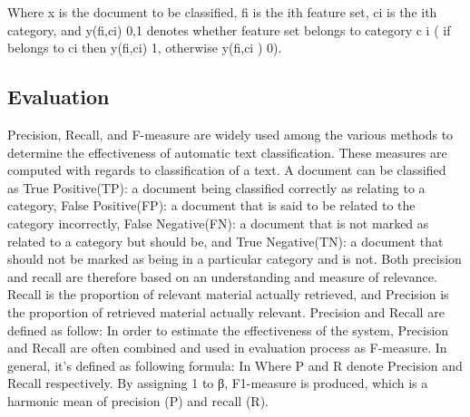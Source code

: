 \documentclass{sigchi}
\begin{document}
Where x is the document to be classified, fi is the ith feature set, ci is the ith category, and y(fi,ci) {0,1} denotes whether feature set belongs to category c i ( if belongs to ci then y(fi,ci) 1, otherwise y(fi,ci ) 0).

\subsection{Evaluation}
Precision, Recall, and F-measure are widely used among the various methods to determine the effectiveness of automatic text classification. 
These measures are computed with regards to classification of a text. 
A document can be classified~\cite{ikonomakis2005text} as True Positive(TP): a document being classified correctly as relating to a category, False Positive(FP): a document that is said to be related to the category incorrectly, False Negative(FN): a document that is not marked as related to a category but should be, and True Negative(TN): a document that should not be marked as being in a particular category and
is not.
Both precision and recall are therefore based on an understanding and measure of relevance. 
Recall is the proportion of relevant material actually retrieved, and Precision is the proportion of retrieved material actually relevant.
Precision and Recall are defined as follow:
In order to estimate the effectiveness of the system, Precision and Recall are often combined and used in evaluation process as F-measure. 
In general, it’s defined as following formula:
In Where P and R denote Precision and Recall respectively. 
By assigning 1 to β, F1-measure is produced, which is a harmonic mean of precision (P) and recall (R).
\end{document}
